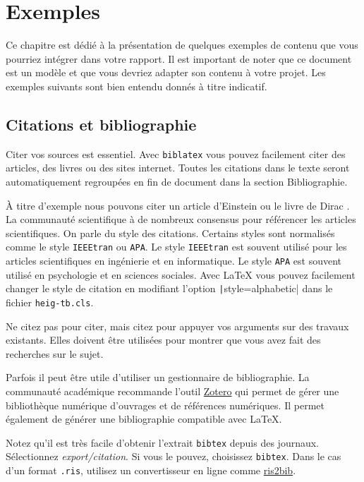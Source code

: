 \chapter{Exemples}

Ce chapitre est dédié à la présentation de quelques exemples de contenu que vous pourriez intégrer dans votre rapport. Il est important de noter que ce document est un modèle et que vous devriez adapter son contenu à votre projet. Les exemples suivants sont bien entendu donnés à titre indicatif.

\section{Citations et bibliographie}

Citer vos sources est essentiel. Avec \texttt{biblatex} vous pouvez facilement citer des articles, des livres ou des sites internet. Toutes les citations dans le texte seront automatiquement regroupées en fin de document dans la section \guillemotleft{} Bibliographie\guillemotright.

À titre d'exemple nous pouvons citer un article d'Einstein \cite{einstein} ou le livre de Dirac \cite{dirac}. La communauté scientifique à de nombreux consensus pour référencer les articles scientifiques. On parle du style des citations. Certains styles sont normalisés comme le style \texttt{IEEEtran} ou \texttt{APA}. Le style \texttt{IEEEtran} est souvent utilisé pour les articles scientifiques en ingénierie et en informatique. Le style \texttt{APA} est souvent utilisé en psychologie et en sciences sociales. Avec \LaTeX{} vous pouvez facilement changer le style de citation en modifiant l'option \texttt|style=alphabetic| dans le fichier \texttt{heig-tb.cls}.

Ne citez pas pour citer, mais citez pour appuyer vos arguments sur des travaux existants. Elles doivent être utilisées pour montrer que vous avez fait des recherches sur le sujet.

Parfois il peut être utile d'utiliser un gestionnaire de bibliographie. La communauté académique recommande l'outil \href{https://www.zotero.org/}{Zotero} qui permet de gérer une bibliothèque numérique d'ouvrages et de références numériques. Il permet également de générer une bibliographie compatible avec \LaTeX.

Notez qu'il est très facile d'obtenir l'extrait \texttt{bibtex} depuis des journaux. Sélectionnez \emph{export/citation}. Si vous le pouvez, choisissez \texttt{bibtex}. Dans le cas d'un format \texttt{.ris}, utilisez un convertisseur en ligne comme \href{http://www.bruot.org/ris2bib/}{ris2bib}.

